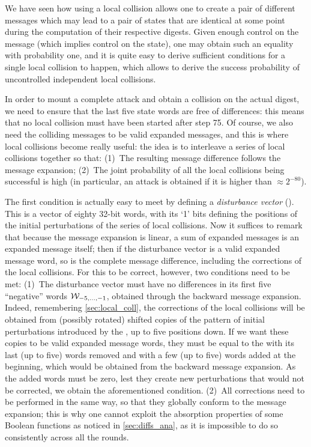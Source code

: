 We have seen how using a local collision allows one to create a pair of different messages which may lead to a pair of \sha states that are identical at some point during the
computation of their respective digests. Given enough control on the message (which implies control on the state), one may obtain such an equality with probability one, and it is quite easy to derive sufficient conditions
for a single local collision to happen, which allows to derive the success probability of uncontrolled independent local collisions.

In order to mount a complete attack and obtain a collision on the actual digest, we need to ensure that the last five state words are free of differences: this means that no local collision
must have been started after step 75. Of course, we also need the colliding messages to be valid expanded messages, and this is where local collisions become really useful: the idea is to
interleave a series of local collisions together so that: (1)~The resulting message difference follows the message expansion; (2)~The joint probability of all the local collisions being successful
is high (in particular, an attack is obtained if it is higher than $\approx 2^{-80}$).

The first condition is actually easy to meet by defining a \emph{disturbance vector} (\dv). This is a vector of eighty 32-bit words, with its `1' bits defining the positions of the initial perturbations of the series
of local collisions.
Now it suffices to remark that because the message expansion is linear, a sum of expanded messages is an expanded message itself;
then if the disturbance vector is a valid expanded message word, so is the complete message difference, including the corrections of the local
collisions. For this to be correct, however, two conditions need to be met: (1)~The disturbance vector must have no differences in its first five ``negative'' words $\mathcal{W}_{-5,\ldots,-1}$, obtained through
the backward message expansion. Indeed, remembering \autoref{sec:local_coll}, the corrections of the local collisions will be obtained from (possibly rotated) shifted copies of the pattern of initial perturbations introduced by the \dv,
up to five positions down. If we want these copies to be valid expanded message words, they must be equal to the \dv with its last (up to five) words removed and with a few (up to five) words
added at the beginning, which would be obtained from the backward message expansion. As the added words must be zero, lest they create new perturbations that would not be corrected, we obtain the aforementioned
condition. (2)~All corrections need to be performed in the same way, so that they globally conform to the message expansion; this is why one cannot exploit the absorption properties of some Boolean functions as noticed in \autoref{sec:diffs_ana},
as it is impossible to do so consistently across all the rounds.

